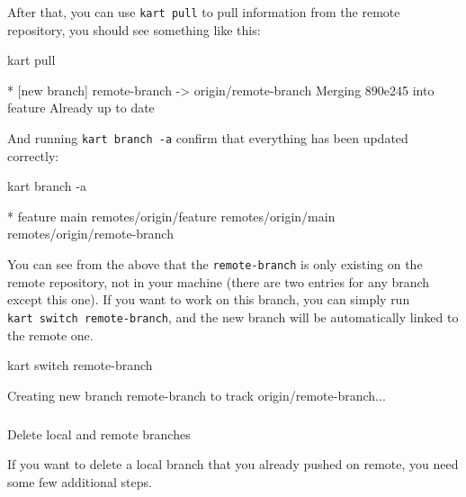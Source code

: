 \documentclass[
  letterpaper,
  DIV=11,
  numbers=noendperiod]{scrartcl}
\makeatletter
\let\oldsubparagraph\subparagraph
\renewcommand{\subparagraph}{
    \@ifstar
      \xxxSubParagraphStar
      \xxxSubParagraphNoStar
  }
\newcommand{\xxxSubParagraphStar}[1]{\oldsubparagraph*{#1}\mbox{}}
\newcommand{\xxxSubParagraphNoStar}[1]{\oldsubparagraph{#1}\mbox{}}
\newenvironment{Shaded}{\begin{snugshade}}{\end{snugshade}}
\newcommand{\AttributeTok}[1]{\textcolor[rgb]{1.00,0.47,0.78}{#1}}
\newcommand{\ExtensionTok}[1]{\textcolor[rgb]{0.55,0.91,0.99}{#1}}
\newcommand{\NormalTok}[1]{\textcolor[rgb]{0.97,0.97,0.95}{#1}}
\newcommand{\OperatorTok}[1]{\textcolor[rgb]{0.97,0.97,0.95}{#1}}
\newcommand{\StringTok}[1]{\textcolor[rgb]{0.95,0.98,0.55}{#1}}
\makeatother
\begin{document}
After that, you can use \texttt{kart\ pull} to pull information from the
remote repository, you should see something like this:

\begin{Shaded}
\begin{Highlighting}[]
\ExtensionTok{kart}\NormalTok{ pull}

 \ExtensionTok{*}\NormalTok{ [new branch]      remote{-}branch }\AttributeTok{{-}}\OperatorTok{\textgreater{}}\NormalTok{ origin/remote{-}branch}
\ExtensionTok{Merging}\NormalTok{ 890e245 into feature}
\ExtensionTok{Already}\NormalTok{ up to date}
\end{Highlighting}
\end{Shaded}

And running \texttt{kart\ branch\ -a} confirm that everything has been
updated correctly:

\begin{Shaded}
\begin{Highlighting}[]
\ExtensionTok{kart}\NormalTok{ branch }\AttributeTok{{-}a}

\ExtensionTok{*}\NormalTok{ feature}
  \ExtensionTok{main}
  \ExtensionTok{remotes/origin/feature}
  \ExtensionTok{remotes/origin/main}
  \ExtensionTok{remotes/origin/remote{-}branch}
\end{Highlighting}
\end{Shaded}

You can see from the above that the \texttt{remote-branch} is only
existing on the remote repository, not in your machine (there are two
entries for any branch except this one). If you want to work on this
branch, you can simply run \texttt{kart\ switch\ remote-branch}, and the
new branch will be automatically linked to the remote one.

\begin{Shaded}
\begin{Highlighting}[]
\ExtensionTok{kart}\NormalTok{ switch remote{-}branch}

\ExtensionTok{Creating}\NormalTok{ new branch }\StringTok{\textquotesingle{}remote{-}branch\textquotesingle{}}\NormalTok{ to track }\StringTok{\textquotesingle{}origin/remote{-}branch\textquotesingle{}}\NormalTok{...}
\end{Highlighting}
\end{Shaded}

\subparagraph{Delete local and remote
branches}\label{delete-local-and-remote-branches}

If you want to delete a local branch that you already pushed on remote,
you need some few additional steps.
\end{document}
